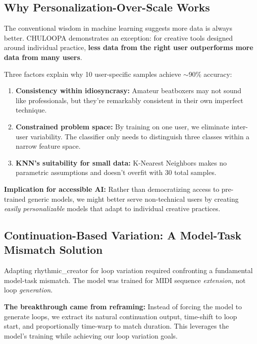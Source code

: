 \documentclass{aimc2026}
\begin{document}
\subsection{Why Personalization-Over-Scale Works}

The conventional wisdom in machine learning suggests more data is always better. CHULOOPA demonstrates an exception: for creative tools designed around individual practice, \textbf{less data from the right user outperforms more data from many users}.

Three factors explain why 10 user-specific samples achieve $\sim$90\% accuracy:

\begin{enumerate}
\item \textbf{Consistency within idiosyncrasy:} Amateur beatboxers may not sound like professionals, but they're remarkably consistent in their own imperfect technique.

\item \textbf{Constrained problem space:} By training on one user, we eliminate inter-user variability. The classifier only needs to distinguish three classes within a narrow feature space.

\item \textbf{KNN's suitability for small data:} K-Nearest Neighbors makes no parametric assumptions and doesn't overfit with 30 total samples.
\end{enumerate}

\textbf{Implication for accessible AI:} Rather than democratizing access to pre-trained generic models, we might better serve non-technical users by creating \emph{easily personalizable} models that adapt to individual creative practices.

\subsection{Continuation-Based Variation: A Model-Task Mismatch Solution}

Adapting rhythmic\_creator for loop variation required confronting a fundamental model-task mismatch. The model was trained for MIDI sequence \emph{extension}, not loop \emph{generation}.

\textbf{The breakthrough came from reframing:} Instead of forcing the model to generate loops, we extract its natural continuation output, time-shift to loop start, and proportionally time-warp to match duration. This leverages the model's training while achieving our loop variation goals.
\end{document}
